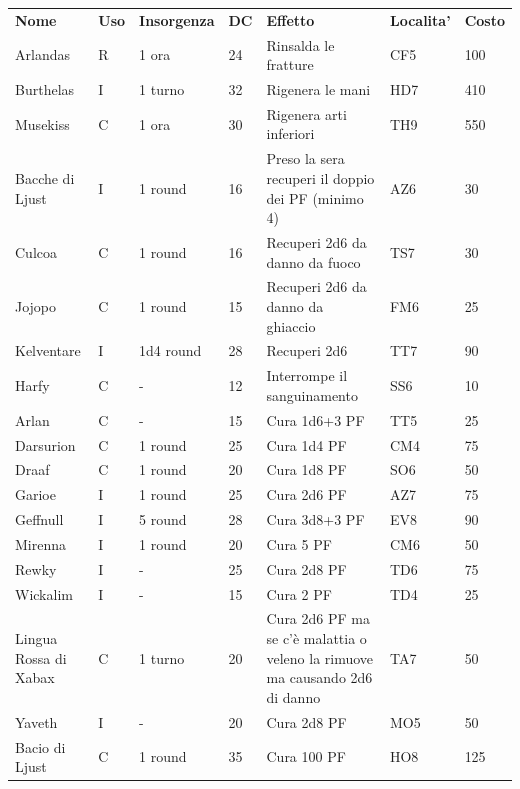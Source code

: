 \documentclass[a4paper,11pt,twoside,openany]{book}
\begin{document}
\begin{longtable}{|L{3.2cm} |k{0.7cm} |k{1.7cm}| D{1cm} |L{5cm} |k{1.5cm} |k{1cm}|}
	\textbf{Nome}  & \textbf{Uso} & \textbf{Insorgenza} & \textbf{DC} & \textbf{Effetto}& \textbf{Localita'} & \textbf{Costo} \\
	Arlandas & R  & 1 ora& 24& Rinsalda le fratture & CF5 & 100  \\
	Burthelas    & I  & 1 turno   & 32& Rigenera le mani& HD7 & 410  \\
	Musekiss & C  & 1 ora& 30& Rigenera arti inferiori   & TH9 & 550  \\
	Bacche di Ljust  & I  & 1 round   & 16& Preso la sera recuperi il doppio dei PF (minimo 4) & AZ6 & 30   \\
	Culcoa& C  & 1 round   & 16& Recuperi 2d6 da danno da fuoco & TS7 & 30   \\
	Jojopo& C  & 1 round   & 15& Recuperi 2d6 da danno da ghiaccio   & FM6 & 25   \\
	Kelventare  & I  & 1d4 round & 28& Recuperi 2d6    & TT7 & 90   \\
	Harfy  & C  & -    & 12& Interrompe il sanguinamento    & SS6 & 10   \\
	Arlan  & C  & -    & 15& Cura 1d6+3 PF   & TT5 & 25   \\
	Darsurion    & C  & 1 round   & 25& Cura 1d4 PF& CM4 & 75   \\
	Draaf  & C  & 1 round   & 20& Cura 1d8 PF& SO6 & 50   \\
	Garioe& I  & 1 round   & 25& Cura 2d6 PF& AZ7 & 75   \\
	Geffnull & I  & 5 round   & 28& Cura 3d8+3 PF   & EV8 & 90   \\
	Mirenna   & I  & 1 round   & 20& Cura 5 PF  & CM6 & 50   \\
	Rewky  & I  & -    & 25& Cura 2d8 PF& TD6 & 75   \\
	Wickalim & I  & -    & 15& Cura 2 PF  & TD4 & 25   \\
	Lingua Rossa di Xabax& C  & 1 turno   & 20& Cura 2d6 PF ma se c'è malattia o veleno la rimuove ma causando 2d6 di danno & TA7 & 50   \\
	Yaveth& I  & -    & 20& Cura 2d8 PF& MO5 & 50   \\
	Bacio di Ljust    & C  & 1 round   & 35& Cura 100 PF& HO8 & 125  \\

\end{longtable}
\end{document}
